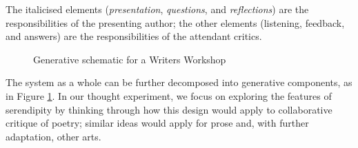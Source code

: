 The italicised elements (\emph{presentation}, \emph{questions}, and
\emph{reflections}) are the responsibilities of the presenting author; the other
elements (listening, feedback, and answers) are the responsibilities of the attendant critics.
%
\begin{figure}[b]
{\centering


\par}
\caption{Generative schematic for a Writers Workshop\label{fig:generative-diagram}}
\end{figure}
%
The system as a whole can be further decomposed into generative
components, as in Figure \ref{fig:generative-diagram}.  In our thought
experiment, we focus on exploring the features of serendipity by
thinking through how this design would apply to collaborative critique
of poetry; similar ideas would apply for prose and, with further
adaptation, other arts.\\
